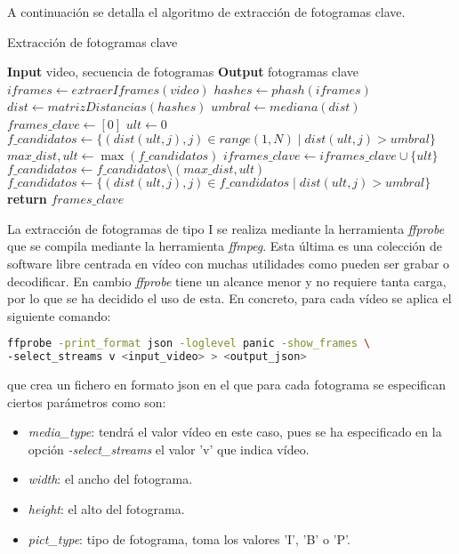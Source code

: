 A continuación se detalla el algoritmo de extracción de fotogramas clave.

\begin{algorithm}
\caption{Extracción de fotogramas clave}
\label{alg_keyframes}
\begin{algorithmic}[1]
\Statex \textbf{Input} video, secuencia de fotogramas
\Statex \textbf{Output} fotogramas clave
\State $iframes \gets extraerIframes(video)$
\State $hashes \gets phash(iframes)$
\State $dist \gets matrizDistancias(hashes)$
\State $umbral \gets mediana(dist)$ 
\State $frames\_clave \gets [0]$
\State $ult \gets 0$ 
\State $f\_candidatos \gets \{(dist(ult,j), j)\in range(1,N) \; | \; dist(ult, j) > umbral\}$ 
   \State $max\_dist, ult \gets \max({f\_candidatos})$
   \State $iframes\_clave \gets iframes\_clave \cup \{ult\}$
   \State $f\_candidatos \gets f\_candidatos \setminus (max\_dist, ult)$
   \State $f\_candidatos \gets \{(dist(ult,j), j)\in f\_candidatos \; | \; dist(ult, j) > umbral\}$ 
\EndWhile
\State \textbf{return} $frames\_clave$
\end{algorithmic}
\end{algorithm}

La extracción de fotogramas de tipo I se realiza mediante la herramienta \textit{ffprobe} que se compila mediante la herramienta \textit{ffmpeg}. Esta última es una colección de software libre centrada en vídeo con muchas utilidades como pueden ser grabar o decodificar. En cambio \textit{ffprobe} tiene un alcance menor y no requiere tanta carga, por lo que se ha decidido el uso de esta. En concreto, para cada vídeo se aplica el siguiente comando:

\begin{lstlisting}[language=bash, basicstyle=\small, caption=Extracción de I-frames]
ffprobe -print_format json -loglevel panic -show_frames \
-select_streams v <input_video> > <output_json>
\end{lstlisting}

que crea un fichero en formato json en el que para cada fotograma se especifican ciertos parámetros como son:
\begin{itemize}
\item \textit{media\_type}: tendrá el valor vídeo en este caso, pues se ha especificado en la opción \textit{-select\_streams} el valor 'v' que indica vídeo.
\item \textit{width}: el ancho del fotograma.
\item \textit{height}: el alto del fotograma.
\item \textit{pict\_type}: tipo de fotograma, toma los valores 'I', 'B' o 'P'. 
\end{itemize}

